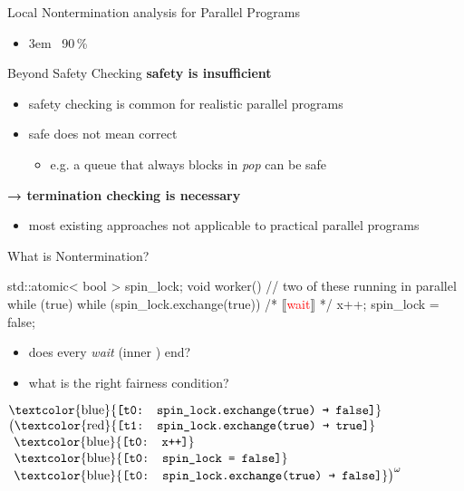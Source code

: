 \documentclass[aspectratio=169, fi]{paradise-slide}
\newcommand{\fcite}[1]{\emergencystretch 3em{\protect\NoHyper\cite{#1}}~\fullcite{#1}}
\newenvironment{prespart}[1]{%
  \begin{frame}{}%
    \centering
      {\Large #1} \par\bigskip\bigskip%
}{%
  \end{frame}%
}
\begin{document}
\begin{prespart}{Local Nontermination analysis for Parallel Programs}
  \begin{itemize}
    \item \fcite{SB2019} \hfill 90\,\%
  \end{itemize}
\end{prespart}

\begin{frame}{Beyond Safety Checking}
  \textbf{safety is insufficient}
  \begin{itemize}
    \item safety checking is common for realistic parallel programs
    \item safe does not mean correct
      \begin{itemize}
        \item e.g. a queue that always blocks in \emph{pop} can be safe
      \end{itemize}
  \end{itemize}

  \bigskip
  \textbf{→ termination checking is necessary}
  \begin{itemize}
    \item most existing approaches not applicable to practical parallel programs
  \end{itemize}
\end{frame}

\begin{frame}[fragile]{What is Nontermination?}
  \begin{cppcode}
  std::atomic< bool > spin_lock;
  void worker() { // two of these running in parallel
      while (true) {
          while (spin_lock.exchange(true)) { /* ⟦\textcolor{red}{wait}⟧ */ }
          x++;
          spin_lock = false;
      }
  }
  \end{cppcode}

  \begin{itemize}
    \item does every \emph{wait} (inner ) end?
    \item what is the right fairness condition?
  \end{itemize}

  \bigskip
  \newcommand{\ta}[1]{\text{\textcolor{blue}{\texttt{[t0: #1]}}}}
  \newcommand{\tb}[1]{\text{\textcolor{red}{\texttt{[t1: #1]}}}}
  $\ta{spin\_lock.exchange(true) \textrightarrow{} false}$\\
  $\big(\tb{spin\_lock.exchange(true) \textrightarrow{} true}$\\
  $\phantom{\big(}\ta{x++}$\\
  $\phantom{\big(}\ta{spin\_lock = false}$\\
  $\phantom{\big(}\ta{spin\_lock.exchange(true) \textrightarrow{} false}\big)^\omega$
\end{frame}
\end{document}
